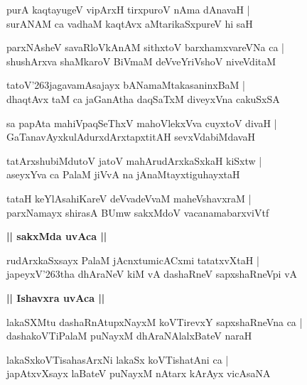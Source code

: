 \documentclass[twoside,12pt,openright]{book}
\def\S{\char'263}
\newcounter{shloka}[chapter]
\def\uvaca#1{\centerline{{\large\textbf{#1}}}}
\begin{document}
\begin{shloka}%
purA kaqtayugeV vipArxH tirxpuroV nAma dAnavaH |\\
surANAM ca vadhaM kaqtAvx aMtarikaSxpureV hi saH 
\end{shloka}

\begin{shloka}%
parxNAsheV savaRloVkAnAM sithxtoV barxhamxvareVNa ca |\\
shushArxva shaMkaroV BiVmaM deVveYriVshoV niveVditaM 
\end{shloka}

\begin{shloka}%
tatoV\S jagavamAsajayx bANamaMtakasaninxBaM |\\
dhaqtAvx taM ca jaGanAtha daqSaTxM diveyxVna cakuSxSA
\end{shloka}

\begin{shloka}%
sa papAta mahiVpaqSeThxV mahoVlekxVva cuyxtoV divaH |\\
GaTanavAyxkulAdurxdArxtapxtitAH sevxVdabiMdavaH
\end{shloka}

\begin{shloka}%
tatArxshubiMdutoV jatoV mahArudArxkaSxkaH kiSxtw |\\
aseyxYva ca PalaM jiVvA na jAnaMtayxtiguhayxtaH 
\end{shloka}

\begin{shloka}%
tataH keYlAsahiKareV deVvadeVvaM maheVshavxraM |\\
parxNamayx shirasA BUmw sakxMdoV vacanamabarxviVtf
\end{shloka}

\uvaca{|| sakxMda uvAca ||}

\begin{shloka}%
rudArxkaSxsayx PalaM jAcnxtumicACxmi tatatxvXtaH |\\
japeyxV\S tha dhAraNeV kiM vA dashaRneV sapxshaRneVpi vA
\end{shloka}

\uvaca{|| Ishavxra uvAca ||}

\begin{shloka}%
lakaSXMtu dashaRnAtupxNayxM koVTirevxY sapxshaRneVna ca |\\
dashakoVTiPalaM puNayxM dhAraNAlalxBateV naraH 
\end{shloka}

\begin{shloka}%
lakaSxkoVTisahasArxNi lakaSx koVTishatAni ca |\\
japAtxvXsayx laBateV puNayxM nAtarx kArAyx vicAsaNA
\end{shloka}
\end{document}

